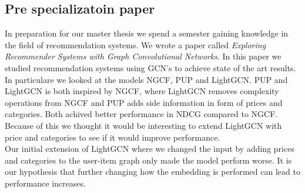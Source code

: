 \subsection{Pre specializatoin paper}
In preparation for our master thesis we spend a semester gaining knowledge in the field of recommendation systems.
We wrote a paper called \textit{Exploring Recommender Systems with Graph Convolutional Networks}.
In this paper we studied recommendation systems using GCN's to achieve state of the art results.
In particulare we looked at the models NGCF, PUP and LightGCN.
PUP and LightGCN is both inspired by NGCF, where LightGCN removes complexity operations from NGCF and PUP adds side information in form of prices and categories.
Both achived better performance in NDCG compared to NGCF.
Because of this we thought it would be interesting to extend LightGCN with price and categories to see if it would improve performance.
\\
Our initial extension of LightGCN where we changed the input by adding prices and categories to the user-item graph only made the model perform worse.
It is our hypothesis that further changing how the embedding is performed can lead to performance increases.

